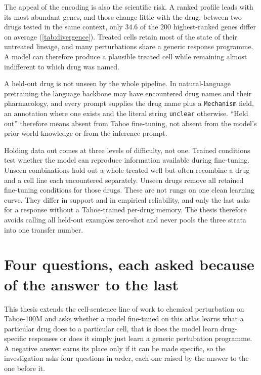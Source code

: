 The appeal of the encoding is also the scientific risk. A ranked profile leads
with its most abundant genes, and those change little with the drug: between
two drugs tested in the same context, only $34.6$ of the $200$ highest-ranked
genes differ on average (\cref{tab:divergence}). Treated cells retain most of
the state of their untreated lineage, and many perturbations share a generic
response programme. A model can therefore produce a plausible treated cell while
remaining almost indifferent to which drug was named.

\begin{scopelimit}
A held-out drug is not unseen by the whole pipeline. In natural-language
pretraining the language backbone may have encountered drug names and their
pharmacology, and every prompt supplies the drug name plus a \texttt{Mechanism}
field, an annotation where one exists and the literal string \texttt{unclear}
otherwise.
``Held out'' therefore means absent from Tahoe fine-tuning, not absent from the
model's prior world knowledge or from the inference prompt.
\end{scopelimit}

Holding data out comes at three levels of difficulty, not one. Trained
conditions test whether the model can reproduce information available during
fine-tuning. Unseen combinations hold out a whole treated well but often
recombine a drug and a cell line each encountered separately. Unseen drugs
remove all retained fine-tuning conditions for those drugs. These are not rungs
on one clean learning curve. They differ in support and in empirical
reliability, and only the last asks for a response without a Tahoe-trained
per-drug memory. The thesis therefore avoids calling all held-out examples
zero-shot and never pools the three strata into one transfer number.

\section{Four questions, each asked because of the answer to the last}
\label{sec:intro-map}

This thesis extends the cell-sentence line of work to chemical perturbation on
Tahoe-100M and asks whether a model fine-tuned on this atlas learns what a
particular drug does to a particular cell, that is does the model learn drug-specific responses or does it simply just learn a generic pertubation programme. A negative answer earns its place
only if it can be made specific, so the investigation asks four questions in
order, each one raised by the answer to the one before it.

